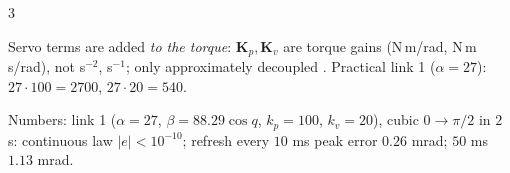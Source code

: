 \begin{multicols}{3}
\begin{wnfig}
{}\par
{}
\end{wnfig}
\begin{slideerr}
Servo terms are added \emph{to the torque}: $\mathbf K_p,\mathbf K_v$ are torque gains (N\,m/rad, N\,m\,s/rad), not s$^{-2}$, s$^{-1}$; only approximately decoupled \added. Practical link 1 ($\alpha=27$): $27\cdot100=2700$, $27\cdot20=540$. \chk
\end{slideerr}
Numbers: link 1 ($\alpha=27$, $\beta=88.29\cos q$, $k_p=100$, $k_v=20$), cubic $0\to\pi/2$ in $2$ s: continuous law $|e|<10^{-10}$; refresh every $10$ ms peak error $0.26$ mrad; $50$ ms $1.13$ mrad. \chk


\end{multicols}
